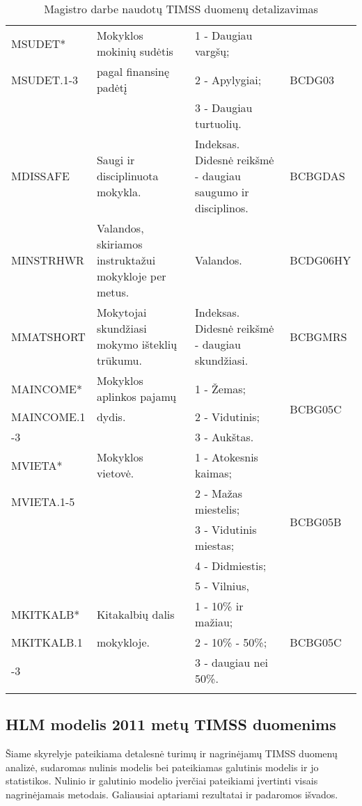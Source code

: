 \documentclass[11pt,a4paper]{article}
\begin{document}
\begin{small}
\begin{longtable}{| p{} | p{5cm} | p{5cm} | p{2.1 cm} |}
MSUDET* & Mokyklos mokinių sudėtis & 1 - Daugiau vargšų; & \multirow{3}{*}{BCDG03}\\
MSUDET.1-3 & pagal finansinę padėtį & 2 - Apylygiai; & \\
& & 3 - Daugiau turtuolių. & \\ \hline
MDISSAFE & Saugi ir disciplinuota mokykla. & Indeksas. Didesnė reikšmė - daugiau saugumo ir disciplinos. &BCBGDAS\\ \hline
MINSTRHWR & Valandos, skiriamos instruktažui mokykloje per metus. & Valandos. &BCDG06HY\\ \hline
MMATSHORT & Mokytojai skundžiasi mokymo išteklių trūkumu. & Indeksas. Didesnė reikšmė - daugiau skundžiasi. &BCBGMRS\\ \hline
MAINCOME* & Mokyklos aplinkos pajamų & 1 - Žemas; & \multirow{3}{*}{BCBG05C}\\
MAINCOME.1& dydis. & 2 - Vidutinis; & \\
-3& & 3 - Aukštas. & \\ \hline
MVIETA* & Mokyklos vietovė. & 1 - Atokesnis kaimas; & \multirow{5}{*}{BCBG05B}\\
MVIETA.1-5& & 2 - Mažas miestelis; & \\
& & 3 - Vidutinis miestas; & \\
& & 4 - Didmiestis; & \\
& & 5 - Vilnius, & \\ \hline
MKITKALB* & Kitakalbių dalis & 1 - 10\% ir mažiau; & \multirow{3}{*}{BCBG05C}\\
MKITKALB.1& mokykloje. & 2 - 10\% - 50\%; & \\
-3& & 3 - daugiau nei 50\%. & \\ \hline
\caption{Magistro darbe naudotų TIMSS duomenų detalizavimas}
\label{table:duom}
\end{longtable}
\end{small}


\subsection{HLM modelis 2011 metų TIMSS duomenims}

\indent Šiame skyrelyje pateikiama detalesnė turimų ir nagrinėjamų TIMSS duomenų analizė, sudaromas nulinis modelis bei pateikiamas galutinis modelis ir jo statistikos. Nulinio ir galutinio modelio įverčiai pateikiami įvertinti visais nagrinėjamais metodais. Galiausiai aptariami rezultatai ir padaromos išvados.
\end{document}
